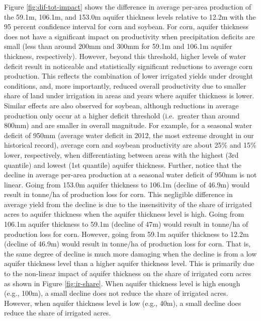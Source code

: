 \documentclass[
]{article}
\begin{document}
Figure \ref{fig:dif-tot-impact} shows the difference in average per-area production of the 59.1m, 106.1m, and 153.0m aquifer thickness levels relative to 12.2m with the 95 percent confidence interval for corn and soybean. For corn, aquifer thickness does not have a significant impact on productivity when precipitation deficits are small (less than around 200mm and 300mm for 59.1m and 106.1m aquifer thickness, respectively). However, beyond this threshold, higher levels of water deficit result in noticeable and statistically significant reductions to average corn production. This reflects the combination of lower irrigated yields under drought conditions, and, more importantly, reduced overall productivity due to smaller share of land under irrigation in areas and years where aquifer thickness is lower. Similar effects are also observed for soybean, although reductions in average production only occur at a higher deficit threshold (i.e.~greater than around 800mm) and are smaller in overall magnitude. For example, for a seasonal water deficit of 950mm (average water deficit in 2012, the most extreme drought in our historical record), average corn and soybean productivity are about 25\% and 15\% lower, respectively, when differentiating between areas with the highest (3rd quantile) and lowest (1st quantile) aquifer thickness. Further, notice that the decline in average per-area production at a seasonal water deficit of 950mm is not linear. Going from 153.0m aquifer thickness to 106.1m (decline of 46.9m) would result in tonne/ha of production loss for corn. This negligible difference in average yield from the decline is due to the insensitivity of the share of irrigated acres to aquifer thickness when the aquifer thickness level is high.
Going from 106.1m aquifer thickness to 59.1m (decline of 47m) would result in tonne/ha of production loss for corn. However, going from 59.1m aquifer thickness to 12.2m (decline of 46.9m) would result in tonne/ha of production loss for corn. That is, the same degree of decline is much more damaging when the decline is from a low aquifer thickness level than a higher aquifer thickness level. This is primarily due to the non-linear impact of aquifer thickness on the share of irrigated corn acres as shown in Figure \ref{fig:ir-share}. When aquifer thickness level is high enough (e.g., 100m), a small decline does not reduce the share of irrigated acres. However, when aquifer thickness level is low (e.g., 40m), a small decline does reduce the share of irrigated acres.
\end{document}
